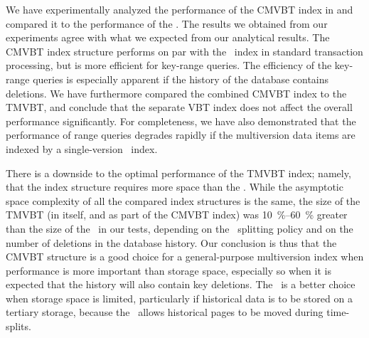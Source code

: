 We have experimentally analyzed the performance of the CMVBT index
in  and compared it to the performance of the
\TSBtree.
The results we obtained from our experiments agree with what we expected
from our analytical results.
The CMVBT index structure performs on par with the \TSBtree\ index in
standard transaction processing, but is more efficient for key-range
queries.
The efficiency of the key-range queries is especially apparent if the
history of the database contains deletions.
We have furthermore compared the combined CMVBT index to the TMVBT, and
conclude that the separate VBT index does not affect the overall performance
significantly.
For completeness, we have also demonstrated that the performance of 
range queries degrades rapidly if the multiversion data items are indexed
by a single-version \Btree\ index.

There is a downside to the optimal performance of the TMVBT index;
namely, that the index structure requires more space than the \TSBtree.
While the asymptotic space complexity of all the compared index structures
is the same, the size of the TMVBT (in itself, and as part of the CMVBT
index) was \SIrange{10}{60}{\percent} greater than the size of the \TSBtree\
in our tests, depending on the \TSBtree\ splitting policy and on the number
of deletions in the database history. 
Our conclusion is thus that the CMVBT structure is a good choice for a
general-purpose multiversion index when performance is more important
than storage space, especially so when it is expected that the history
will also contain key deletions.
The \TSBtree\ is a better choice when storage space is limited, particularly
if historical data is to be stored on a tertiary storage, because the
\TSBtree\ allows historical pages to be moved during time-splits. 

